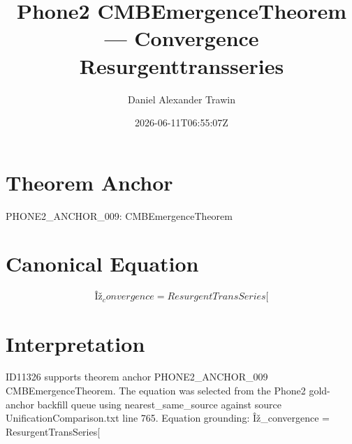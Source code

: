 \documentclass[11pt]{article}
\title{Phone2 CMBEmergenceTheorem — Convergence Resurgenttransseries}
\author{Daniel Alexander Trawin}
\date{2026-06-11T06:55:07Z}
\begin{document}
\maketitle
\section*{Theorem Anchor}
PHONE2_ANCHOR_009: CMBEmergenceTheorem
\section*{Canonical Equation}
\[
Îž_convergence = ResurgentTransSeries[
\]
\section*{Interpretation}
ID11326 supports theorem anchor PHONE2_ANCHOR_009 CMBEmergenceTheorem. The equation was selected from the Phone2 gold-anchor backfill queue using nearest_same_source against source UnificationComparison.txt line 765. Equation grounding: Îž_convergence = ResurgentTransSeries[
\end{document}
